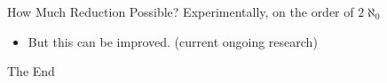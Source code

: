 \documentclass{beamer}
\begin{document}
\begin{frame}{How Much Reduction Possible?}
Experimentally, on the order of $2\aleph_0$

\begin{itemize}
\item But this can be improved. (current ongoing research)
\end{itemize}

\end{frame}

\begin{frame}{The End}
\begin{figure}
  	\centering
  \end{figure}
\end{frame}

 

% 
%
\end{document}
